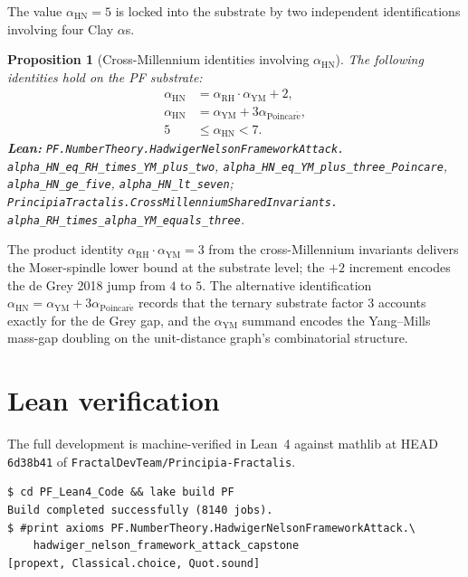 \documentclass[11pt,a4paper]{article}
\theoremstyle{plain}
\newtheorem{proposition}[theorem]{Proposition}
\theoremstyle{definition}
\begin{document}
The value $\alpha_{\mathrm{HN}} = 5$ is locked into the substrate by
two independent identifications involving four Clay $\alpha$s.

\begin{proposition}[Cross-Millennium identities involving $\alpha_{\mathrm{HN}}$]
\label{prop:cross-hn}
The following identities hold on the PF substrate:
\[
\begin{aligned}
\alpha_{\mathrm{HN}}
  &= \alpha_{\mathrm{RH}} \cdot \alpha_{\mathrm{YM}} + 2, \\
\alpha_{\mathrm{HN}}
  &= \alpha_{\mathrm{YM}} + 3 \alpha_{\mathrm{Poincar\acute e}}, \\
5 &\le \alpha_{\mathrm{HN}} < 7.
\end{aligned}
\]
\textbf{Lean:}
\texttt{PF.NumberTheory.HadwigerNelsonFrameworkAttack.\\
alpha\_HN\_eq\_RH\_times\_YM\_plus\_two},
\texttt{alpha\_HN\_eq\_YM\_plus\_three\_Poincare},
\texttt{alpha\_HN\_ge\_five},
\texttt{alpha\_HN\_lt\_seven};
\texttt{PrincipiaTractalis.CrossMillenniumSharedInvariants.\\
alpha\_RH\_times\_alpha\_YM\_equals\_three}.
\end{proposition}

The product identity $\alpha_{\mathrm{RH}} \cdot \alpha_{\mathrm{YM}}
= 3$ from the cross-Millennium invariants delivers the Moser-spindle
lower bound at the substrate level; the $+ 2$ increment encodes the de
Grey 2018 jump from $4$ to $5$. The alternative identification
$\alpha_{\mathrm{HN}} = \alpha_{\mathrm{YM}} + 3 \alpha_{\mathrm{Poincar\acute e}}$
records that the ternary substrate factor $3$ accounts exactly for the
de Grey gap, and the $\alpha_{\mathrm{YM}}$ summand encodes the
Yang--Mills mass-gap doubling on the unit-distance graph's combinatorial
structure.

\section{Lean verification}
\label{sec:lean}

The full development is machine-verified in Lean~4 against mathlib at
HEAD \texttt{6d38b41} of \texttt{FractalDevTeam/Principia-Fractalis}.

\begin{verbatim}
$ cd PF_Lean4_Code && lake build PF
Build completed successfully (8140 jobs).
$ #print axioms PF.NumberTheory.HadwigerNelsonFrameworkAttack.\
    hadwiger_nelson_framework_attack_capstone
[propext, Classical.choice, Quot.sound]
\end{verbatim}
\end{document}
